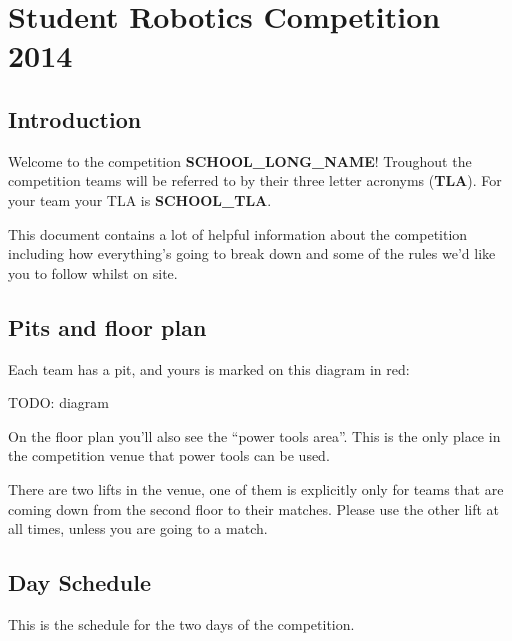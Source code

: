 \documentclass[12pt]{article}
\begin{document}
\section{Student Robotics Competition 2014}

\subsection{Introduction}

Welcome to the competition \textbf{SCHOOL_LONG_NAME}! Troughout the competition
teams will be referred to by their three letter acronyms (\textbf{TLA}). For
your team your TLA is \textbf{SCHOOL_TLA}.

This document contains a lot of helpful information about the
competition including how everything's going to break down and some of
the rules we'd like you to follow whilst on site.

\subsection{Pits and floor plan}

Each team has a pit, and yours is marked on this diagram in red:

TODO: diagram

On the floor plan you'll also see the ``power tools area''. This is the only
place in the competition venue that power tools can be used.

There are two lifts in the venue, one of them is explicitly only for teams that are coming
down from the second floor to their matches. Please use the other lift at all
times, unless you are going to a match.

\subsection{Day Schedule}

This is the schedule for the two days of the competition.
\end{document}
